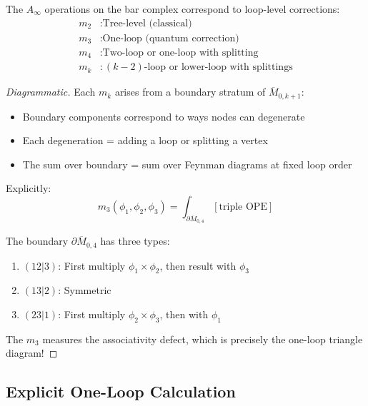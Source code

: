 \begin{theorem}[Loop Expansion = $A_\infty$ Operations]
The $A_\infty$ operations on the bar complex correspond to loop-level corrections:
\begin{align*}
m_2 &: \text{Tree-level (classical)} \\
m_3 &: \text{One-loop (quantum correction)} \\
m_4 &: \text{Two-loop or one-loop with splitting} \\
m_k &: \text{$(k-2)$-loop or lower-loop with splittings}
\end{align*}
\end{theorem}

\begin{proof}[Diagrammatic]
Each $m_k$ arises from a boundary stratum of $\overline{M}_{0,k+1}$:
\begin{itemize}
\item Boundary components correspond to ways nodes can degenerate
\item Each degeneration = adding a loop or splitting a vertex
\item The sum over boundary = sum over Feynman diagrams at fixed loop order
\end{itemize}

Explicitly:
$$m_3(\phi_1, \phi_2, \phi_3) = \int_{\partial \overline{M}_{0,4}} 
[\text{triple OPE}]$$

The boundary $\partial \overline{M}_{0,4}$ has three types:
\begin{enumerate}
\item $(12|3)$: First multiply $\phi_1 \times \phi_2$, then result with $\phi_3$
\item $(13|2)$: Symmetric
\item $(23|1)$: First multiply $\phi_2 \times \phi_3$, then with $\phi_1$
\end{enumerate}

The $m_3$ measures the associativity defect, which is precisely the one-loop 
triangle diagram!
\end{proof}

\subsection{Explicit One-Loop Calculation}

